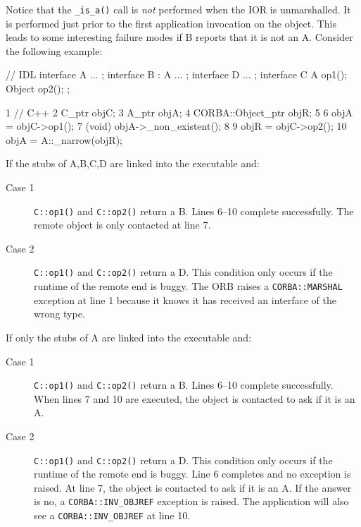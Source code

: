 \documentclass[11pt,twoside,a4paper]{book}
\newcommand{\code}[1]{\texttt{#1}}
\newcommand{\op}[1]{\texttt{#1()}}
\begin{document}
Notice that the \op{\_is\_a} call is \emph{not} performed when the IOR
is unmarshalled. It is performed just prior to the first application
invocation on the object. This leads to some interesting failure modes
if B reports that it is not an A. Consider the following example:

\begin{idllisting}
// IDL
interface A { ... };
interface B : A { ... };
interface D { ... };
interface C {
  A      op1();
  Object op2();
};
\end{idllisting}

\lstset{labelstep=1,gobble=4}
\begin{cxxlisting}
 1  // C++
 2  C_ptr objC;
 3  A_ptr objA;
 4  CORBA::Object_ptr objR;
 5
 6  objA =  objC->op1();
 7  (void) objA->_non_existent();
 8
 9  objR =  objC->op2();
10  objA =  A::_narrow(objR);
\end{cxxlisting}
\lstset{labelstep=0,gobble=0}

\noindent If the stubs of A,B,C,D are linked into the executable and:

\begin{description}
\item[Case 1] \op{C::op1} and \op{C::op2} return a B. Lines 6--10
complete successfully. The remote object is only contacted at line 7.

\item[Case 2] \op{C::op1} and \op{C::op2} return a D. This condition
only occurs if the runtime of the remote end is buggy. The ORB raises
a \code{CORBA::MARSHAL} exception at line 1 because it knows it has
received an interface of the wrong type.
\end{description}

\noindent If only the stubs of A are linked into the executable and:

\begin{description}
\item[Case 1] \op{C::op1} and \op{C::op2} return a B. Lines 6--10
complete successfully. When lines 7 and 10 are executed, the object is
contacted to ask if it is an A.

\item[Case 2] \op{C::op1} and \op{C::op2} return a D. This condition
only occurs if the runtime of the remote end is buggy. Line 6
completes and no exception is raised. At line 7, the object is
contacted to ask if it is an A. If the answer is no, a
\code{CORBA::INV\_OBJREF} exception is raised. The application will
also see a \code{CORBA::INV\_OBJREF} at line 10.
\end{description}
\end{document}
